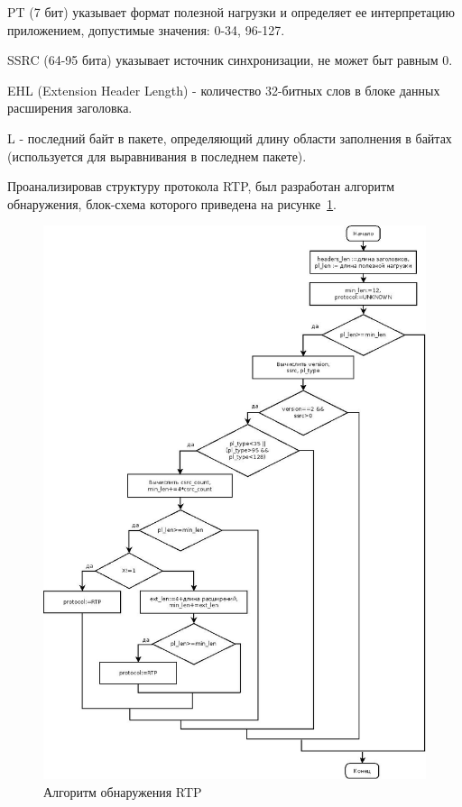 PT (7 бит) указывает формат полезной нагрузки и определяет ее интерпретацию приложением, допустимые значения: 0-34, 96-127.

SSRC (64-95 бита) указывает источник синхронизации, не может быт равным 0.

EHL (Extension Header Length) - количество 32-битных слов в блоке данных расширения заголовка.

L - последний байт в пакете, определяющий длину области заполнения в байтах (используется для выравнивания в последнем пакете).

Проанализировав структуру протокола RTP, был разработан алгоритм обнаружения, блок-схема которого приведена на рисунке~\ref{pic:rtp_alg}.
\begin{figure}
\centering
\includegraphics[scale=0.45]{pictures/rtp_alg}
\caption{Алгоритм обнаружения RTP}
\label{pic:rtp_alg}
\end{figure}


